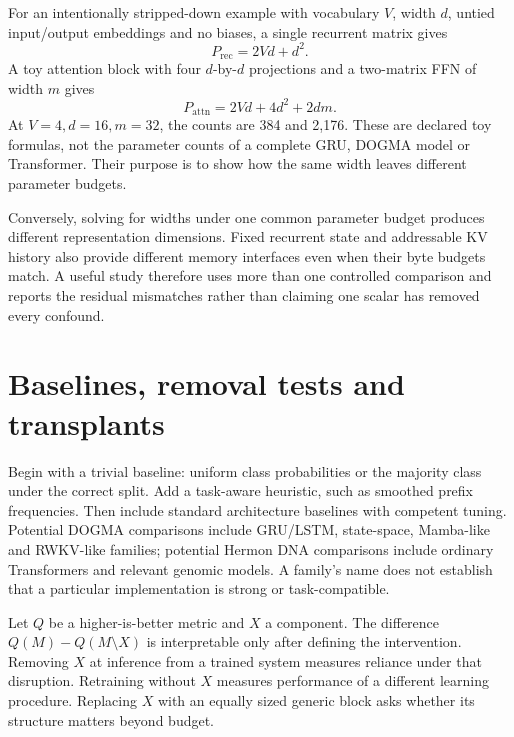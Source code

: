 
For an intentionally stripped-down example with vocabulary $V$, width $d$, untied input/output embeddings and no biases, a single recurrent matrix gives
\[
P_{\mathrm{rec}}=2Vd+d^2.
\]
A toy attention block with four $d$-by-$d$ projections and a two-matrix FFN of width $m$ gives
\[
P_{\mathrm{attn}}=2Vd+4d^2+2dm.
\]
At $V=4,d=16,m=32$, the counts are 384 and 2,176. These are declared toy formulas, not the parameter counts of a complete GRU, DOGMA model or Transformer. Their purpose is to show how the same width leaves different parameter budgets.

Conversely, solving for widths under one common parameter budget produces different representation dimensions. Fixed recurrent state and addressable KV history also provide different memory interfaces even when their byte budgets match. A useful study therefore uses more than one controlled comparison and reports the residual mismatches rather than claiming one scalar has removed every confound.

\section{Baselines, removal tests and transplants}
Begin with a trivial baseline: uniform class probabilities or the majority class under the correct split. Add a task-aware heuristic, such as smoothed prefix frequencies. Then include standard architecture baselines with competent tuning. Potential DOGMA comparisons include GRU/LSTM, state-space, Mamba-like and RWKV-like families; potential Hermon DNA comparisons include ordinary Transformers and relevant genomic models. A family's name does not establish that a particular implementation is strong or task-compatible.\cite{mamba}


Let $Q$ be a higher-is-better metric and $X$ a component. The difference $Q(M)-Q(M\setminus X)$ is interpretable only after defining the intervention. Removing $X$ at inference from a trained system measures reliance under that disruption. Retraining without $X$ measures performance of a different learning procedure. Replacing $X$ with an equally sized generic block asks whether its structure matters beyond budget.

